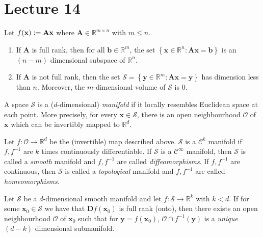 \section{Lecture 14}

Let $f(\mathbf{x}) \vcentcolon= \mathbf{Ax}$ where $\mathbf{A} \in \mathbb{R}^{m \times n}$ with $m \leq n$. 

\begin{thm}
    \begin{enumerate}
        \item If $\mathbf{A}$ is full rank, then for all $\mathbf{b} \in \mathbb{R}^m$, the set $\left\{ \mathbf{x} \in \mathbb{R}^n \colon \mathbf{Ax} = \mathbf{b} \right\}$ is an $(n-m)$ dimensional subspace of $\mathbb{R}^n$. 

        \item If $\mathbf{A}$ is not full rank, then the set $\mathcal{S} = \left\{ \mathbf{y} \in \mathbb{R}^m \colon \mathbf{Ax} = \mathbf{y} \right\}$ has dimension less than $n$. Moreover, the $m$-dimensional volume of $\mathcal{S}$ is $0$. 
    \end{enumerate}
\end{thm}

\begin{defn}[Manifold]
    A space $\mathcal{S}$ is a ($d$-dimensional) \emph{manifold} if it locally resembles Euclidean space at each point. More precisely, for every $\mathbf{x} \in \mathcal{S}$, there is an open neighbourhood $\mathcal{O}$ of $\mathbf{x}$ which can be invertibly mapped to $\mathbb{R}^d$. 
\end{defn}

Let $f \colon \mathcal{O} \to \mathbb{R}^d$ be the (invertible) map described above. $\mathcal{S}$ is a $\mathcal{C}^k$ manifold if $f,f^{-1}$ are $k$ times continuously differentiable. If $\mathcal{S}$ is a $\mathcal{C}^{\infty}$ manifold, then $\mathcal{S}$ is called a \emph{smooth} manifold and $f,f^{-1}$ are called \emph{diffeomorphisms}. If $f,f^{-1}$ are continuous, then $\mathcal{S}$ is called a \emph{topological} manifold and $f,f^{-1}$ are called \emph{homeomorphisms}.

\begin{thm}
    Let $\mathcal{S}$ be a $d$-dimensional smooth manifold and let $f \colon \mathcal{S} \to \mathbb{R}^k$ with $k < d$. If for some $\mathbf{x}_0 \in \mathcal{S}$ we have that $\mathbf{D}f(\mathbf{x}_0)$ is full rank (onto), then there exists an open neighbourhood $\mathcal{O}$ of $\mathbf{x}_0$ such that for $\mathbf{y} = f(\mathbf{x}_0)$, $\mathcal{O} \cap f^{-1}(\mathbf{y})$ is a \emph{unique} $(d-k)$ dimensional submanifold. 
\end{thm}

